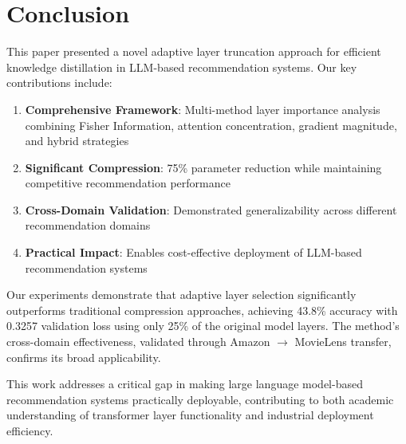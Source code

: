 \documentclass[sigconf]{acmart}
\begin{document}
\section{Conclusion}

This paper presented a novel adaptive layer truncation approach for efficient knowledge distillation in LLM-based recommendation systems. Our key contributions include:

\begin{enumerate}
\item \textbf{Comprehensive Framework}: Multi-method layer importance analysis combining Fisher Information, attention concentration, gradient magnitude, and hybrid strategies
\item \textbf{Significant Compression}: 75\% parameter reduction while maintaining competitive recommendation performance
\item \textbf{Cross-Domain Validation}: Demonstrated generalizability across different recommendation domains
\item \textbf{Practical Impact}: Enables cost-effective deployment of LLM-based recommendation systems
\end{enumerate}

Our experiments demonstrate that adaptive layer selection significantly outperforms traditional compression approaches, achieving 43.8\% accuracy with 0.3257 validation loss using only 25\% of the original model layers. The method's cross-domain effectiveness, validated through Amazon $\rightarrow$ MovieLens transfer, confirms its broad applicability.

This work addresses a critical gap in making large language model-based recommendation systems practically deployable, contributing to both academic understanding of transformer layer functionality and industrial deployment efficiency.



\end{document}
